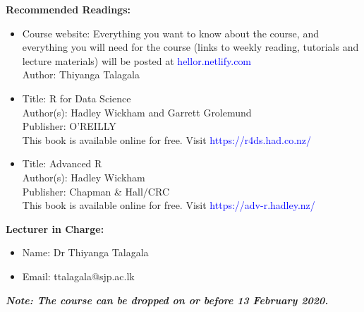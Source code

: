 \documentclass[a4paper,12pt]{article}
\begin{document}
\noindent\textbf{Recommended Readings:}
\begin{itemize}
	\setlength\itemsep{0.1mm}
	\item Course website: Everything you want to know about the course, and everything you will need for the course (links to weekly reading, tutorials and lecture materials) will be posted at \textcolor{blue}{hellor.netlify.com}\\
	Author: Thiyanga Talagala
	\item Title: R for Data Science \\
		  Author(s): Hadley Wickham and Garrett Grolemund \\
		  Publisher: O'REILLY \\
		  This book is available online for free. Visit \textcolor{blue}{https://r4ds.had.co.nz/}
		\item Title: Advanced R \\
		  Author(s): Hadley Wickham \\
		  Publisher: Chapman \& Hall/CRC \\
		  This book is available online for free. Visit \textcolor{blue}{https://adv-r.hadley.nz/}
\end{itemize}

\noindent\textbf{Lecturer in Charge:}

\begin{itemize}
	\setlength\itemsep{0.1mm}
	\item[] Name: Dr Thiyanga  Talagala
	\item[] Email: ttalagala@sjp.ac.lk
\end{itemize}


\noindent\textbf{\textit{Note: The course can be dropped on or before 13 February 2020.}}
\end{document}
